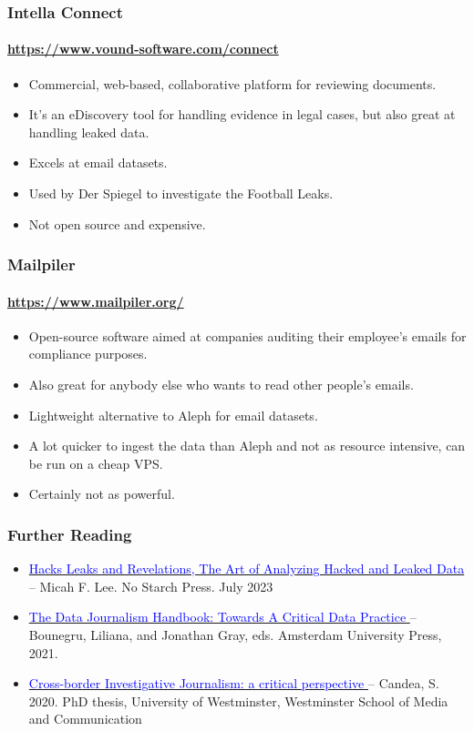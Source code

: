 \documentclass[aspectratio=169,usenames,dvipsnames]{beamer}
\begin{document}
\begin{frame}
  \frametitle{Intella Connect}
  \framesubtitle{\url{https://www.vound-software.com/connect}}

  \begin{itemize}[<+->]
    \item Commercial, web-based, collaborative platform for reviewing
      documents.
    \item It's an eDiscovery tool for handling evidence in legal cases, but
      also great at handling leaked data.
    \item Excels at email datasets.
    \item Used by Der Spiegel to investigate the Football Leaks.
    \item Not open source and expensive.
  \end{itemize}

\end{frame}

\begin{frame}
  \frametitle{Mailpiler}
  \framesubtitle{\url{https://www.mailpiler.org/}}

  \begin{itemize}[<+->]
    \item Open-source software aimed at companies auditing their employee's
      emails for compliance purposes.
    \item Also great for anybody else who wants to read other people's emails.
    \item Lightweight alternative to Aleph for email datasets.
    \item A lot quicker to ingest the data than Aleph and not as resource
      intensive, can be run on a cheap VPS.
    \item Certainly not as powerful.
  \end{itemize}

\end{frame}

\begin{frame}
  \frametitle{Further Reading}

  \begin{itemize}
    \item
      \href{https://nostarch.com/hacks-leaks-and-revelations}{\textcolor{blue}{Hacks
      Leaks and Revelations, The Art of Analyzing Hacked and Leaked Data
      }} -- Micah F. Lee. No Starch Press. July 2023
    \item
      \href{https://www.jstor.org/stable/j.ctv1qr6smr}{\textcolor{blue}{The
      Data Journalism Handbook: Towards A Critical Data Practice
      }} -- Bounegru, Liliana, and Jonathan Gray, eds. Amsterdam University
      Press, 2021.
    \item
      \href{https://westminsterresearch.westminster.ac.uk/item/v402w/cross-border-investigative-journalism-a-critical-perspective}{\textcolor{blue}{Cross-border Investigative Journalism: a critical perspective
      }} -- Candea, S. 2020. PhD thesis, University of Westminster, Westminster
      School of Media and Communication
  \end{itemize}
\end{frame}
\end{document}

